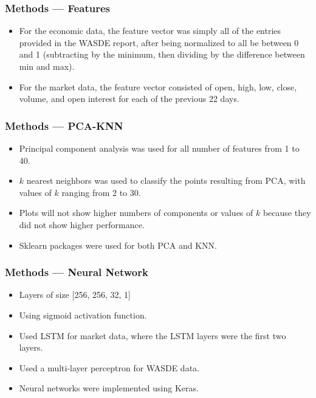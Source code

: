 \documentclass{beamer}
\begin{document}
\begin{frame}
\frametitle{Methods --- Features}
\begin{itemize}
\item For the economic data, the feature vector was simply all of the entries provided in the WASDE report, after being normalized to all be between 0 and 1 (subtracting by the minimum, then dividing by the difference between min and max).
\item For the market data, the feature vector consisted of open, high, low, close, volume, and open interest for each of the previous 22 days.
\end{itemize}
\end{frame}

\begin{frame}
\frametitle{Methods --- PCA-KNN}
\begin{itemize}
\item Principal component analysis was used for all number of features from 1 to 40.
\item $k$ nearest neighbors was used to classify the points resulting from PCA, with values of $k$ ranging from 2 to 30.
\item Plots will not show higher numbers of components or values of $k$ because they did not show higher performance.
\item Sklearn packages were used for both PCA and KNN.
\end{itemize}
\end{frame}

\begin{frame}
\frametitle{Methods --- Neural Network}
\begin{itemize}
\item Layers of size [256, 256, 32, 1]
\item Using sigmoid activation function.
\item Used LSTM for market data, where the LSTM layers were the first two layers.
\item Used a multi-layer perceptron for WASDE data.
\item Neural networks were implemented using Keras.
\end{itemize}
\end{frame}
\end{document}
